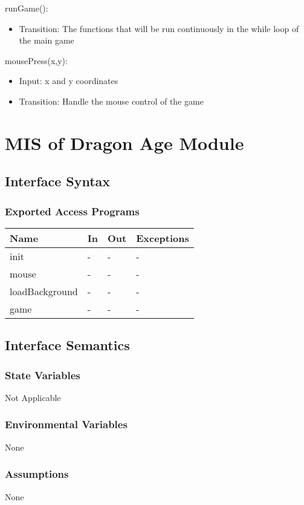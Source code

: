 \documentclass[12,english]{article}
\begin{document}
\noindent runGame():
\begin{itemize}
    \item Transition: The functions that will be run continuously in the while loop of the main game
\end{itemize}

\noindent mousePress(x,y):
\begin{itemize}
    \item Input: x and y coordinates
    \item Transition: Handle the mouse control of the game
\end{itemize}

\section{MIS of Dragon Age Module}
\subsection{Interface Syntax}
\subsubsection{Exported Access Programs}
\begin{table}[h!]
    \centering
    \begin{tabular}{|p{4cm}|p{2cm}|p{2cm}|p{2cm}|}
    \hline
    \textbf {Name}  & {In} & {Out} & {Exceptions} \\
    \hline
    init & - & - & -\\
    \hline 
    mouse & - & - & -\\
    \hline 
    loadBackground & - & - & -\\
    \hline 
    game & - & - & -\\
    \hline 
    \end{tabular}
\end{table}
\subsection{Interface Semantics}
\subsubsection{State Variables}
Not Applicable 
\subsubsection{Environmental Variables}
None
\subsubsection{Assumptions}
None
\end{document}
